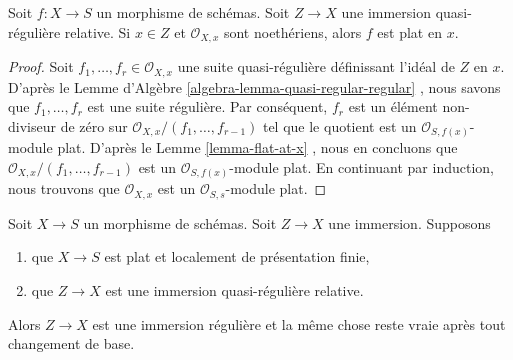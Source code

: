 \begin{lemma}
\label{lemma-quasi-regular-immersion-flat-at-x}
Soit  $f : X \to S$  un morphisme de schémas. Soit  $Z \to X$  une immersion
quasi-régulière relative. Si  $x \in Z$  et  $\mathcal{O}_{X, x}$  sont noethériens, alors
 $f$  est plat en  $x$.
\end{lemma}

\begin{proof}
Soit  $f_1, \ldots, f_r \in \mathcal{O}_{X, x}$  une suite quasi-régulière définissant l'idéal de  $Z$  en
 $x$. D'après le Lemme d'Algèbre  \ref{algebra-lemma-quasi-regular-regular} , nous savons que
 $f_1, \ldots, f_r$  est une suite régulière. Par conséquent,  $f_r$  est un élément
non-diviseur de zéro sur  $\mathcal{O}_{X, x}/(f_1, \ldots, f_{r - 1})$  tel que le quotient est un
 $\mathcal{O}_{S, f(x)}$-module plat. D'après le Lemme  \ref{lemma-flat-at-x} , nous en concluons que
 $\mathcal{O}_{X, x}/(f_1, \ldots, f_{r - 1})$  est un  $\mathcal{O}_{S, f(x)}$-module plat. En continuant par induction, nous
trouvons que  $\mathcal{O}_{X, x}$  est un  $\mathcal{O}_{S, s}$-module plat.
\end{proof}

\begin{lemma}
\label{lemma-relative-regular-immersion-flat-in-neighbourhood}
Soit  $X \to S$  un morphisme de schémas. Soit  $Z \to X$  une immersion.
Supposons
\begin{enumerate}
\item que $X \to S$  est plat et localement de présentation finie,
\item que $Z \to X$  est une immersion quasi-régulière relative.
\end{enumerate}
Alors  $Z \to X$  est une immersion régulière et la même chose reste vraie après
tout changement de base.
\end{lemma}

